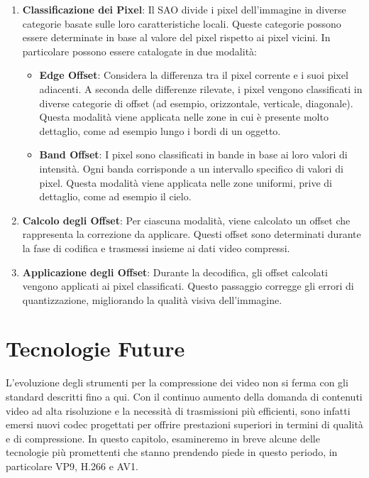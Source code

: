 \documentclass[a4paper,12pt, oneside]{article}
\begin{document}
\begin{enumerate}
    \item \textbf{Classificazione dei Pixel}: Il SAO divide i pixel dell'immagine in diverse categorie basate
    sulle loro caratteristiche locali. Queste categorie possono essere determinate in base al valore del pixel
    rispetto ai pixel vicini. In particolare possono essere catalogate in due modalità:
    
    \begin{itemize}
        \item \textbf{Edge Offset}: Considera la differenza tra il pixel corrente e i suoi pixel adiacenti.
        A seconda delle differenze rilevate, i pixel vengono classificati in diverse categorie di offset (ad
        esempio, orizzontale, verticale, diagonale). Questa modalità viene applicata nelle zone in cui è
        presente molto dettaglio, come ad esempio lungo i bordi di un oggetto.
        \item \textbf{Band Offset}: I pixel sono classificati in bande in base ai loro valori di intensità.
        Ogni banda corrisponde a un intervallo specifico di valori di pixel. Questa modalità viene applicata
        nelle zone uniformi, prive di dettaglio, come ad esempio il cielo.
    \end{itemize}
    
    \item \textbf{Calcolo degli Offset}: Per ciascuna modalità, viene calcolato un offset che rappresenta la
    correzione da applicare. Questi offset sono determinati durante la fase di codifica e trasmessi insieme
    ai dati video compressi.
    \item \textbf{Applicazione degli Offset}: Durante la decodifica, gli offset calcolati vengono applicati
    ai pixel classificati. Questo passaggio corregge gli errori di quantizzazione, migliorando la qualità
    visiva dell'immagine.
\end{enumerate}

\section{Tecnologie Future}
L'evoluzione degli strumenti per la compressione dei video non si ferma con gli standard descritti fino a qui. Con il continuo
aumento della domanda di contenuti video ad alta risoluzione e la necessità di trasmissioni più efficienti,
sono infatti emersi nuovi codec progettati per offrire prestazioni superiori in termini di qualità e di compressione.
In questo capitolo, esamineremo in breve alcune delle tecnologie più promettenti che stanno prendendo piede
in questo periodo, in particolare VP9, H.266 e AV1.
\end{document}
